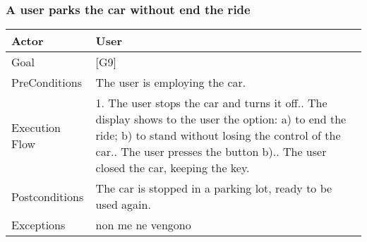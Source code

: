 \documentclass{article}
\begin{document}
	\subsubsection{A user parks the car without end the ride}
	\begin{tabularx}{\textwidth}{  l  X  }
		\hline
		Actor & User\\
		\hline
		Goal & [G9]\\
		\hline
		PreConditions & The user is employing the car.\\
		\hline
		Execution Flow & 1. The user stops the car and turns it off.\newline
										 2. The display shows to the user the option:\newline
										 					a) to end the ride;\newline
															b) to stand without losing the control of the car.\newline
										 3. The user presses the button b).\newline
										 4. The user closed the car, keeping the key.\\
		\hline
		Postconditions & The car is stopped in a parking lot, ready to be used again.\\
		\hline
		Exceptions & non me ne vengono\\
		\hline
	\end{tabularx}
\end{document}
